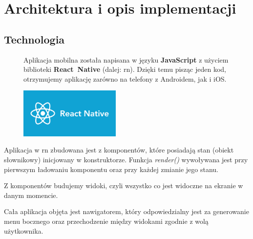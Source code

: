 \section{Architektura i opis implementacji}

\subsection{Technologia}
\begin{figure}[!htb]
    \centering
    \begin{minipage}{.6\textwidth}
Aplikacja mobilna została napisana w języku \textbf{JavaScript} z użyciem biblioteki \textbf{React~Native}\cite{react-native} (dalej: \acrshort{rn}). Dzięki temu pisząc jeden kod, otrzymujemy aplikację zarówno na telefony z Androidem, jak i iOS.
    \end{minipage}%
    \begin{minipage}{.4\textwidth}
        \centering
        \includegraphics[width=5cm]{images/ReactNative.png}\label{RN_logo}
    \end{minipage}
\end{figure}

Aplikacja w \acrshort{rn} zbudowana jest z komponentów, które posiadają stan (obiekt słownikowy) inicjowany w konstruktorze. Funkcja \textit{render()} wywoływana jest przy pierwszym ładowaniu komponentu oraz przy każdej zmianie jego stanu. 

Z komponentów budujemy widoki, czyli wszystko co jest widoczne na ekranie w danym momencie.

Cała aplikacja objęta jest nawigatorem, który odpowiedzialny jest za generowanie menu bocznego oraz przechodzenie między widokami zgodnie z wolą użytkownika. \\

